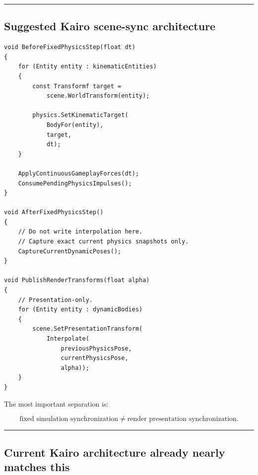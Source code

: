 \begin{center}\rule{0.5\linewidth}{0.5pt}\end{center}

\subsection{Suggested Kairo scene-sync architecture}\label{06-engine-ii-ch038-suggested-kairo-scene-sync-architecture}

\hypertarget{06-engine-ii-ch038-suggested-kairo-scene-sync-architecture}{}

\begin{verbatim}
void BeforeFixedPhysicsStep(float dt)
{
    for (Entity entity : kinematicEntities)
    {
        const Transformf target =
            scene.WorldTransform(entity);

        physics.SetKinematicTarget(
            BodyFor(entity),
            target,
            dt);
    }

    ApplyContinuousGameplayForces(dt);
    ConsumePendingPhysicsImpulses();
}

void AfterFixedPhysicsStep()
{
    // Do not write interpolation here.
    // Capture exact current physics snapshots only.
    CaptureCurrentDynamicPoses();
}

void PublishRenderTransforms(float alpha)
{
    // Presentation-only.
    for (Entity entity : dynamicBodies)
    {
        scene.SetPresentationTransform(
            Interpolate(
                previousPhysicsPose,
                currentPhysicsPose,
                alpha));
    }
}
\end{verbatim}

The most important separation is:

\[
\boxed{
\text{fixed simulation synchronization}
\neq
\text{render presentation synchronization}.
}
\]

\begin{center}\rule{0.5\linewidth}{0.5pt}\end{center}

\subsection{Current Kairo architecture already nearly matches this}\label{06-engine-ii-ch038-current-kairo-architecture-already-nearly-matches-this}

\hypertarget{06-engine-ii-ch038-current-kairo-architecture-already-nearly-matches-this}{}

